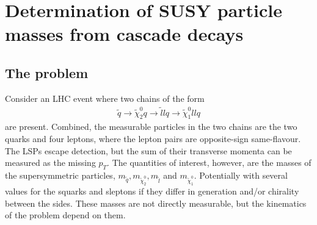 \documentclass[twoside,english]{uiofysmaster}
\begin{document}


















\chapter{Determination of SUSY particle masses from cascade decays}%
\label{ch:introducing_the_method}




\section{The problem}
Consider an LHC event where two chains of the form
\begin{align}
	\tilde q \to \tilde\chi_2^0q \to \tilde l l q \to \tilde \chi_1^0 ll q\label{eq:goldencascade}
\end{align}
are present. Combined, the measurable particles in the two chains are the two quarks and four leptons, where the lepton pairs are opposite-sign same-flavour. The LSPs escape detection, but the sum of their transverse momenta can be measured as the missing $p_T$. The quantities of interest, however, are the masses of the supersymmetric particles, $m_{\tilde{q}}, m_{\tilde{\chi}_2^0}, m_{\tilde{l}}$ and $m_{\tilde{\chi}_1^0}$. Potentially with several values for the squarks and sleptons if they differ in generation and/or chirality between the sides. These masses are not directly measurable, but the kinematics of the problem depend on them. 
\end{document}
